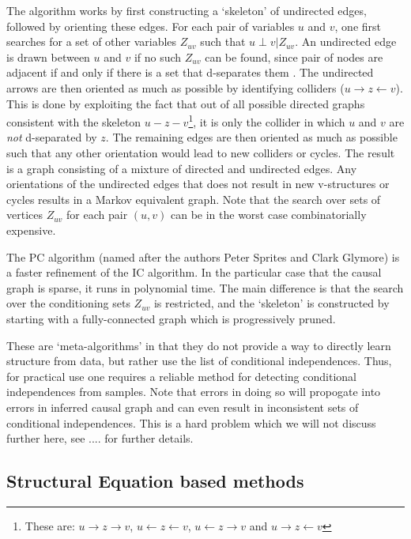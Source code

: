 The algorithm works by first constructing a `skeleton' of undirected edges, followed by orienting these edges.
For each pair of variables $u$ and $v$, one first searches for a set of other variables $Z_{uv}$ such that $u \perp v| Z_{uv}$. 
An undirected edge is drawn between $u$ and $v$ if no such $Z_{uv}$ can be found, since pair of nodes are adjacent if and only if there is a set that d-separates them \cite{elem causality, lemma 7.8}. 
The undirected arrows are then oriented as much as possible by identifying colliders ($u \rightarrow z \leftarrow v$).
This is done by exploiting the fact that out of all possible directed graphs consistent with the skeleton $u - z- v $\footnote{These are: $u \rightarrow z \rightarrow v$, $u \leftarrow z \leftarrow v$, $u \leftarrow  z \rightarrow v$ and $u \rightarrow z \leftarrow v$}, it is only the collider in which $u$ and $v$ are \emph{not} d-separated by $z$.
The remaining edges are then oriented as much as possible such that any other orientation would lead to new colliders or cycles. 
The result is a graph consisting of a mixture of directed and undirected edges. Any orientations of the undirected edges that does not result in new v-structures or cycles results in a Markov equivalent graph.
Note that the search over sets of vertices $Z_{uv}$ for each pair $(u,v)$ can be in the worst case combinatorially expensive.

The PC algorithm (named after the authors Peter Sprites and Clark Glymore) is a faster refinement of the IC algorithm. In the particular case that the causal graph is sparse, it runs in polynomial time. The main difference is that the search over the conditioning sets $Z_{uv}$ is restricted, and the `skeleton'  is constructed by starting with a fully-connected graph which is progressively pruned.  

These are `meta-algorithms' in that they do not provide a way to directly learn structure from data, but rather use the list of conditional independences.  
Thus, for practical use one requires a reliable method for detecting conditional independences from samples.
Note that errors in doing so will propogate into errors in inferred causal graph and can even result in inconsistent sets of conditional independences. 
This is a hard problem which we will not discuss further here, see .... for further details.

\subsection{Structural Equation based methods}

